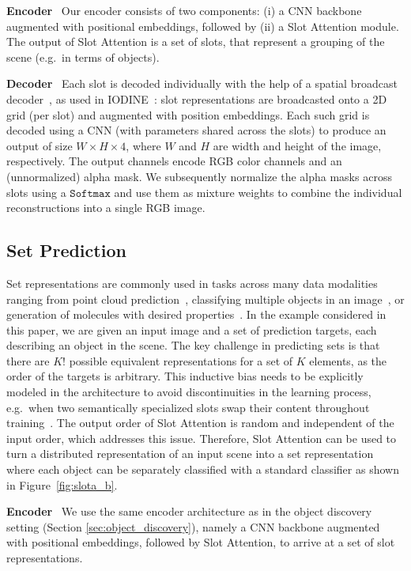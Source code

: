 \documentclass{article}
\newcommand{\sam}[0]{Slot Attention\xspace}
\begin{document}
\textbf{Encoder} \ Our encoder consists of two components: (i) a CNN backbone augmented with positional embeddings, followed by (ii) a Slot Attention module. The output of \sam is a set of slots, that represent a grouping of the scene (e.g.~in terms of objects).

\textbf{Decoder} \ Each slot is decoded individually with the help of a spatial broadcast decoder~\citep{watters2019spatial}, as used in IODINE~\citep{greff2019multi}: slot representations are broadcasted onto a 2D grid (per slot) and augmented with position embeddings. Each such grid is decoded using a CNN (with parameters shared across the slots) to produce an output of size $W\times H\times 4$, where $W$ and $H$ are width and height of the image, respectively. The output channels encode RGB color channels and an (unnormalized) alpha mask. We subsequently normalize the alpha masks across slots using a $\texttt{Softmax}$ and use them as mixture weights to combine the individual reconstructions into a single RGB image.

\subsection{Set Prediction}
\label{sec:set_prediction}
Set representations are commonly used in tasks across many data modalities ranging from point cloud prediction~\citep{achlioptas2018learning,fan2017point}, classifying multiple objects in an image~\citep{zhang2019deep}, or generation of molecules with desired properties~\citep{de2018molgan,simonovsky2018graphvae}.
In the example considered in this paper, we are given an input image and a set of prediction targets, each describing an object in the scene. The key challenge in predicting sets is that there are $K!$ possible equivalent representations for a set of $K$ elements, as the order of the targets is arbitrary. This inductive bias needs to be explicitly modeled in the architecture to avoid discontinuities in the learning process, e.g.~when two semantically specialized slots swap their content throughout training~\citep{zhang2019deep,zhang2019fspool}.
The output order of \sam is random and independent of the input order, which addresses this issue. Therefore, \sam can be used to turn a distributed representation of an input scene into a set representation where each object can be separately classified with a standard classifier as shown in Figure~\ref{fig:slota_b}.

\textbf{Encoder} \ We use the same encoder architecture as in the object discovery setting (Section \ref{sec:object_discovery}), namely a CNN backbone augmented with positional embeddings, followed by \sam, to arrive at a set of slot representations.
\end{document}
